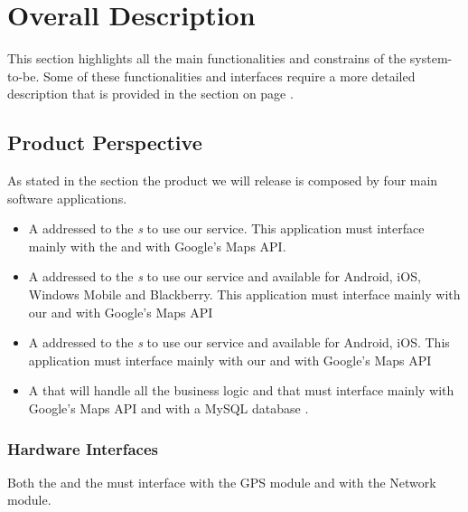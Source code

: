 \section{Overall Description}
\label{sec:overall-description}
This section highlights all the main functionalities and constrains of the system-to-be.
Some of these functionalities and interfaces require a more detailed description that is provided in the \emph{} section on page \pageref{sec:specific-requirements}.
\subsection{Product Perspective}
\label{sec:product_perspective}
As stated in the \emph{} section the product we will release is composed by four main software applications.
\begin{itemize}
  \item A \textbf{} addressed to the \emph{s}  to use our service. This application must interface mainly with the \textbf{} and with Google's Maps API.
  \item A \textbf{} addressed to the \emph{s} to use our service and available for Android, iOS, Windows Mobile and Blackberry. This application must interface mainly with our \textbf{} and with Google's Maps API
  \item A \textbf{} addressed to the \emph{s} to use our service and available for Android, iOS. This application must interface mainly with our \textbf{} and with Google's Maps API

  \item A \textbf{} that will handle all the business logic and that must interface mainly with Google's Maps API and with a MySQL database .
\end{itemize}

\subsubsection{Hardware Interfaces}
\label{subs:hardwareinterfaces}
Both the \textbf{} and the \textbf{} must interface with the GPS module and with the Network module.\\


